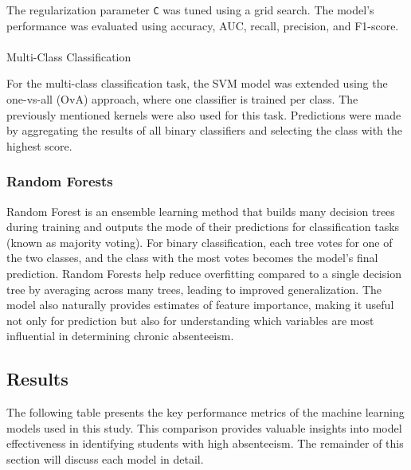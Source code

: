 \documentclass[
  11pt,
]{article}
\makeatletter
\let\oldparagraph\paragraph
\renewcommand{\paragraph}{
    \@ifstar
      \xxxParagraphStar
      \xxxParagraphNoStar
  }
\newcommand{\xxxParagraphStar}[1]{\oldparagraph*{#1}\mbox{}}
\newcommand{\xxxParagraphNoStar}[1]{\oldparagraph{#1}\mbox{}}
\makeatother
\begin{document}
The regularization parameter \texttt{C} was tuned using a grid search.
The model's performance was evaluated using accuracy, AUC, recall,
precision, and F1-score.

\paragraph{Multi-Class
Classification}\label{multi-class-classification-1}

For the multi-class classification task, the SVM model was extended
using the one-vs-all (OvA) approach, where one classifier is trained per
class. The previously mentioned kernels were also used for this task.
Predictions were made by aggregating the results of all binary
classifiers and selecting the class with the highest score.

\subsubsection{Random Forests}\label{random-forests}

Random Forest is an ensemble learning method that builds many decision
trees during training and outputs the mode of their predictions for
classification tasks (known as majority voting). For binary
classification, each tree votes for one of the two classes, and the
class with the most votes becomes the model's final prediction. Random
Forests help reduce overfitting compared to a single decision tree by
averaging across many trees, leading to improved generalization. The
model also naturally provides estimates of feature importance, making it
useful not only for prediction but also for understanding which
variables are most influential in determining chronic absenteeism.

\subsection{Results}\label{results}

The following table presents the key performance metrics of the machine
learning models used in this study. This comparison provides valuable
insights into model effectiveness in identifying students with high
absenteeism. The remainder of this section will discuss each model in
detail.
\end{document}
